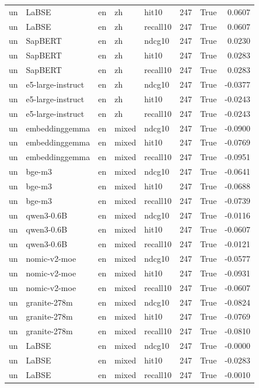 \begin{tabular}{lllllrrr}
un & LaBSE & en & zh & hit10 & 247 & True & 0.0607 \\
un & LaBSE & en & zh & recall10 & 247 & True & 0.0607 \\
un & SapBERT & en & zh & ndcg10 & 247 & True & 0.0230 \\
un & SapBERT & en & zh & hit10 & 247 & True & 0.0283 \\
un & SapBERT & en & zh & recall10 & 247 & True & 0.0283 \\
un & e5-large-instruct & en & zh & ndcg10 & 247 & True & -0.0377 \\
un & e5-large-instruct & en & zh & hit10 & 247 & True & -0.0243 \\
un & e5-large-instruct & en & zh & recall10 & 247 & True & -0.0243 \\
un & embeddinggemma & en & mixed & ndcg10 & 247 & True & -0.0900 \\
un & embeddinggemma & en & mixed & hit10 & 247 & True & -0.0769 \\
un & embeddinggemma & en & mixed & recall10 & 247 & True & -0.0951 \\
un & bge-m3 & en & mixed & ndcg10 & 247 & True & -0.0641 \\
un & bge-m3 & en & mixed & hit10 & 247 & True & -0.0688 \\
un & bge-m3 & en & mixed & recall10 & 247 & True & -0.0739 \\
un & qwen3-0.6B & en & mixed & ndcg10 & 247 & True & -0.0116 \\
un & qwen3-0.6B & en & mixed & hit10 & 247 & True & -0.0607 \\
un & qwen3-0.6B & en & mixed & recall10 & 247 & True & -0.0121 \\
un & nomic-v2-moe & en & mixed & ndcg10 & 247 & True & -0.0577 \\
un & nomic-v2-moe & en & mixed & hit10 & 247 & True & -0.0931 \\
un & nomic-v2-moe & en & mixed & recall10 & 247 & True & -0.0607 \\
un & granite-278m & en & mixed & ndcg10 & 247 & True & -0.0824 \\
un & granite-278m & en & mixed & hit10 & 247 & True & -0.0769 \\
un & granite-278m & en & mixed & recall10 & 247 & True & -0.0810 \\
un & LaBSE & en & mixed & ndcg10 & 247 & True & -0.0000 \\
un & LaBSE & en & mixed & hit10 & 247 & True & -0.0283 \\
un & LaBSE & en & mixed & recall10 & 247 & True & -0.0010 \\

\end{tabular}
